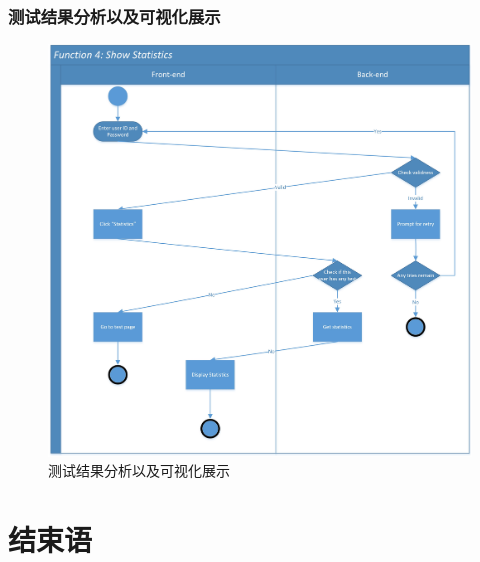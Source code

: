 \documentclass[twoside,11pt]{article}
\begin{document}
\subsubsection{测试结果分析以及可视化展示}
\begin{figure}[H]
    \centering
    \includegraphics[width=1\columnwidth]{SwimLaneDiagram/Usecase_4.jpg}
    \caption{测试结果分析以及可视化展示}  
    \label{fig:statistics}
\end{figure}
\newpage

\section{结束语}
\end{document}
